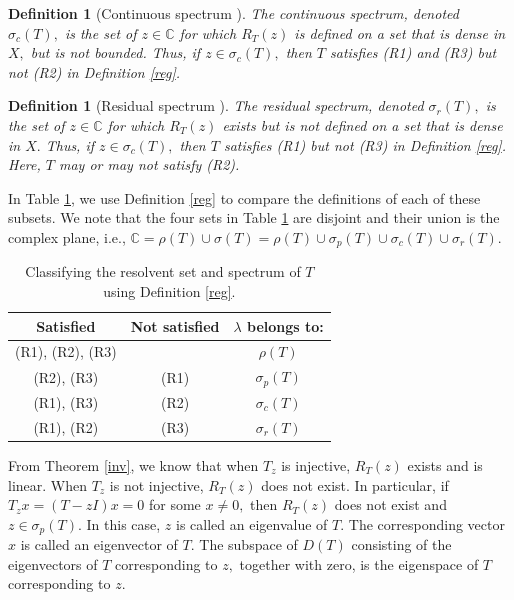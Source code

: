 \documentclass[12pt,a4paper]{article}
\theoremstyle{boldthm}
\theoremstyle{bolddefn}
\newtheorem{definition}[theorem]{Definition}
\begin{document}
\begin{definition}[{Continuous spectrum \cite[7.2-1]{krey}}] 
    The continuous spectrum, denoted $\sigma_c(T),$ is the set of $z \in \mathbb{C}$ for which $R_T(z)$ is defined on a set that is dense in $X,$ but is not bounded. Thus, if $z \in \sigma_c(T),$ then $T$ satisfies (R1) and (R3) but not (R2) in Definition \ref{reg}.
\end{definition}

\begin{definition}[{Residual spectrum \cite[7.2-1]{krey}}] 
    The residual spectrum, denoted $\sigma_r(T),$ is the set of $z \in \mathbb{C}$ for which $R_T(z)$ exists but is not defined on a set that is dense in $X.$  Thus, if $z \in \sigma_c(T),$ then $T$ satisfies (R1) but not (R3) in Definition \ref{reg}. Here, $T$ may or may not satisfy (R2).
\end{definition}

In Table \ref{tab}, we use Definition \ref{reg} to compare the definitions of each of these subsets.
We note that the four sets in Table \ref{tab} are disjoint and their union is the complex plane, i.e., $\mathbb{C} = \rho(T) \cup \sigma(T) = \rho(T) \cup \sigma_p(T) \cup \sigma_c(T) \cup \sigma_r(T).$ 

\begin{table}[htbp]
\centering
\renewcommand{\arraystretch}{1.25}
\setlength{\tabcolsep}{18pt}
\begin{tabular}{|c|c|c|}
\hline
\textbf{Satisfied} & \textbf{Not satisfied} & $\lambda$ \textbf{ belongs to:} \\
\hline
(R1), (R2), (R3) & & $\rho(T)$ \\
\hline
(R2), (R3) & (R1) & $\sigma_p(T)$ \\
(R1), (R3) & (R2) & $\sigma_c(T)$ \\
(R1), (R2) & (R3) & $\sigma_r(T)$\\
\hline
\end{tabular}
\caption{Classifying the resolvent set and spectrum of $T$ using Definition \ref{reg}.}
\label{tab}
\end{table}




From Theorem \ref{inv}, we know that when $T_z$ is injective, $R_T(z)$ exists and is linear. When $T_z$ is not injective, $R_T(z)$ does not exist. In particular, if $T_z x = (T-zI)x = 0$ for some $x \ne 0,$ then $R_T(z)$ does not exist and $z \in \sigma_p(T).$ In this case, $z$ is called an eigenvalue of $T.$ The corresponding vector $x$ is called an eigenvector of $T.$ The subspace of $D(T)$ consisting of the eigenvectors of $T$ corresponding to $z,$ together with zero, is the eigenspace of $T$ corresponding to $z.$ 
\end{document}
